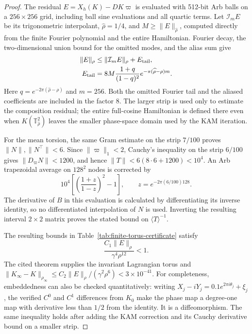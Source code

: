 \begin{proof}
The residual $E=X_h(K)-DK\varpi$ is evaluated with 512-bit Arb balls
on a $256\times256$ grid, including ball sine evaluations and all
quartic terms. Let $\mathcal I_mE$ be its trigonometric interpolant,
$\widehat\rho=1/4$, and $M\geq\|E\|_{\widehat\rho}$, computed directly
from the finite Fourier polynomial and the entire Hamiltonian.
Fourier decay, the two-dimensional union bound for the omitted modes,
and the alias sum give
\begin{equation}
 \begin{aligned}
 \|E\|_\rho&\leq\|\mathcal I_mE\|_\rho+E_{\rm tail},\\
 E_{\rm tail}&=8M\frac{1+q}{(1-q)^2}e^{-\pi(\widehat\rho-\rho)m}.
 \end{aligned}
 \label{eq:HL-alias-bound}
\end{equation}
Here $q=e^{-2\pi(\widehat\rho-\rho)}$ and $m=256$.
Both the omitted Fourier tail and the aliased coefficients are included
in the factor $8$. The larger strip is used only to estimate the
composition residual; the entire full-cosine Hamiltonian is defined
there even when $K(\mathbb T^2_{\widehat\rho})$ leaves the smaller
phase-space domain used by the KAM iteration.

For the mean torsion, the same Gram estimate on the strip $7/100$
proves $\|N\|,\|N^\top\|<6$. Since $\|\varpi\|_1<2$, Cauchy's
inequality on the strip $6/100$ gives $\|D_\varpi N\|<1200$, and hence
$\|T\|<6(8\cdot6+1200)<10^4$.
An Arb trapezoidal average on $128^2$ nodes is corrected by
\[
 10^4\left[\left(\frac{1+z}{1-z}\right)^2-1\right],
 \qquad z=e^{-2\pi(6/100)128}.
\]
The derivative of $B$ in this evaluation is calculated by differentiating
its inverse identity, so no differentiated interpolation of $N$ is used.
Inverting the resulting interval $2\times2$ matrix proves the stated
bound on $\langle T\rangle^{-1}$.

The resulting bounds in Table~\ref{tab:finite-torus-certificate} satisfy
\begin{equation}
 \frac{C_1\|E\|_\rho}{\gamma^4\rho^{12}}<1.
 \label{eq:HL-final-smallness}
\end{equation}
The cited theorem supplies the invariant Lagrangian torus and
$\|K_\infty-K\|_{\rho_\infty}
\leq C_2\|E\|_\rho/(\gamma^2\rho^6)<3\times10^{-41}$.
For completeness, embeddedness can also be checked quantitatively:
writing $X_j-iY_j=0.1e^{2\pi i\theta_j}+\xi_j$, the verified
$C^0$ and $C^1$ differences from $K_0$ make the phase map a
degree-one map with derivative less than $1/2$ from the identity.
It is a diffeomorphism. The same inequality holds after adding the
KAM correction and its Cauchy derivative bound on a smaller strip.


\end{proof}
